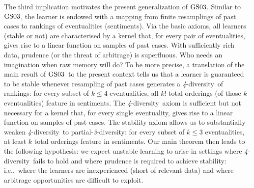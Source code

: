 \documentclass[ecta,nameyear,draft]{econsocart}
\makeatletter
\newcommand{\parthreediv}{\textup{partial-\textit{3}-diversity}}
\newcommand{\fourdiv}{\textit{4}-\textup{diversity}}
\newcommand\ie{i\@.e\@ifnextchar.{}{.\@}}
\newcommand{\gsii}{$\textup{GS03}$}
\theoremstyle{plain}
\theoremstyle{remark}
\makeatother
\begin{document}
The third implication motivates the present {generalization} of \gsii. Similar
to \gsii, the learner is endowed with a mapping from finite resamplings of past
cases to rankings of eventualities (sentiments).  Via the basic axioms, all
learners (stable or not) are characterised by a kernel that, for every pair of
eventualities, gives rise to a linear function on samples of past cases.
With sufficiently rich data, prudence (or the threat of arbitrage) is
superfluous. Who needs an imagination when raw memory will do? To be more
precise, a translation of the main result of \gsii\ to the present context
tells us that a learner is guaranteed to be stable whenever resampling of past
cases generates a \fourdiv\ of rankings: for every subset of $k \leq 4$
eventualities, all $k!$ total orderings (of those $k$ eventualities) feature in
{sentiments}.  The \fourdiv\ axiom is sufficient but not necessary for a kernel
that, for every single eventuality, gives rise to a linear function on samples
of past cases. The stability axiom allows us to substantially weaken \fourdiv\
to \parthreediv: for every subset of $k \leq 3$ eventualities, at least $k$
total orderings feature in {sentiments}. Our main theorem then leads to the
following hypothesis: we expect unstable learning to arise in settings where
\fourdiv\ fails to hold and where prudence is required to achieve stability:
\ie\ where the learners are inexperienced (short of relevant data) and where
arbitrage opportunities are difficult to exploit.
\end{document}
